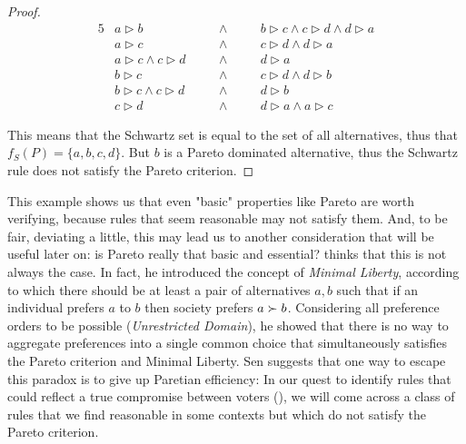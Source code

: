 \begin{proof}
\begin{minipage}{.45\textwidth}
{
		}
	\end{minipage}
	\begin{minipage}{.45\textwidth}
		\raggedleft
	\begin{alignat*}{5}
		&a \rhd b && \land \quad &&b \rhd c \land c \rhd d \land d \rhd a\\
		&a \rhd c &&\land \ && c \rhd d \land d \rhd a\\
		&a \rhd c \land c \rhd d \quad &&\land \ &&d \rhd a \\		
		&b \rhd c &&\land \ &&c \rhd d \land d \rhd b \\
		&b \rhd c \land c \rhd d &&\land \ &&d \rhd b \\	
		&c \rhd d &&\land \ &&d \rhd a \land a \rhd c
	\end{alignat*}
\end{minipage}
	
	\vspace{2em}
	\noindent
	This means that the Schwartz set is equal to the set of all alternatives, thus that $f_S(P)=\{a,b,c,d\}$. But $b$ is a Pareto dominated alternative, thus the Schwartz rule does not satisfy the Pareto criterion.
\end{proof}

This example shows us that even "basic" properties like Pareto are worth verifying, because rules that seem reasonable may not satisfy them.
And, to be fair, deviating a little, this may lead us to another consideration that will be useful later on: is Pareto really that basic and essential? \citet{Sen1970,Sen2004} thinks that this is not always the case. 
In fact, he introduced the concept of \textit{Minimal Liberty}, according to which there should be at least a pair of alternatives $a,b$ such that if an individual prefers $a$ to $b$ then society prefers $a \succ b$.
Considering all preference orders to be possible (\textit{Unrestricted Domain}), he showed that there is no way to aggregate preferences into a single common choice that simultaneously satisfies the Pareto criterion and Minimal Liberty.
Sen suggests that one way to escape this paradox is to give up Paretian efficiency:
\citep{Sen1970}
In our quest to identify rules that could reflect a true compromise between voters (), we will come across a class of rules that we find reasonable in some contexts but which do not satisfy the Pareto criterion.

